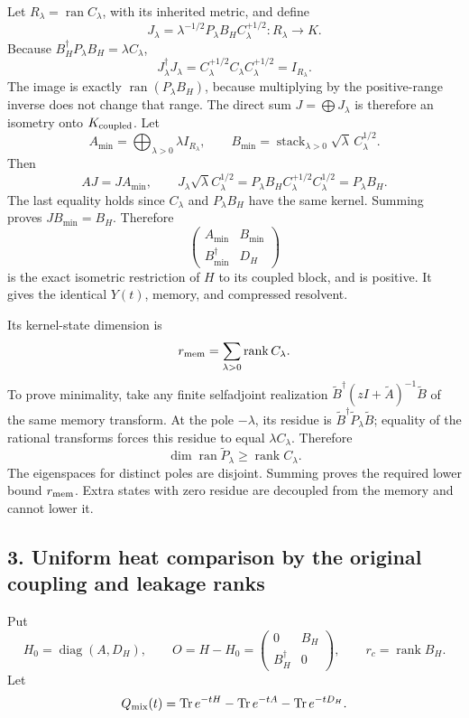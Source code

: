 \documentclass[11pt]{article}
\begin{document}
Let \(R_\lambda=\operatorname{ran}C_\lambda\), with its inherited metric, and define \[
 J_\lambda=\lambda^{-1/2}P_\lambda B_HC_\lambda^{+1/2}:R_\lambda\to K.
\] Because \(B_H^\dagger P_\lambda B_H=\lambda C_\lambda\), \[
 J_\lambda^\dagger J_\lambda
 =C_\lambda^{+1/2}C_\lambda C_\lambda^{+1/2}=I_{R_\lambda}.
\] The image is exactly \(\operatorname{ran}(P_\lambda B_H)\), because multiplying by the positive-range inverse does not change that range. The direct sum \(J=\bigoplus J_\lambda\) is therefore an isometry onto \(K_{\rm coupled}\). Let \[
 A_{\min}=\bigoplus_{\lambda>0}\lambda I_{R_\lambda},\qquad
 B_{\min}=\operatorname{stack}_{\lambda>0}\sqrt\lambda\,C_\lambda^{1/2}.
\] Then \[
 AJ=JA_{\min},\qquad
 J_\lambda\sqrt\lambda C_\lambda^{1/2}
 =P_\lambda B_H C_\lambda^{+1/2}C_\lambda^{1/2}
 =P_\lambda B_H.
\] The last equality holds since \(C_\lambda\) and \(P_\lambda B_H\) have the same kernel. Summing proves \(JB_{\min}=B_H\). Therefore \[
 \begin{pmatrix}A_{\min}&B_{\min}\\B_{\min}^\dagger&D_H\end{pmatrix}
\] is the exact isometric restriction of \(H\) to its coupled block, and is positive. It gives the identical \(Y(t)\), memory, and compressed resolvent.

Its kernel-state dimension is \[
 r_{\rm mem}=\sum_{\lambda>0}\operatorname{rank}C_\lambda.
\] To prove minimality, take any finite selfadjoint realization \(\widetilde B^\dagger(zI+\widetilde A)^{-1}\widetilde B\) of the same memory transform. At the pole \(-\lambda\), its residue is \(\widetilde B^\dagger\widetilde P_\lambda\widetilde B\); equality of the rational transforms forces this residue to equal \(\lambda C_\lambda\). Therefore \[
 \dim\operatorname{ran}\widetilde P_\lambda
 \ge\operatorname{rank}C_\lambda.
\] The eigenspaces for distinct poles are disjoint. Summing proves the required lower bound \(r_{\rm mem}\). Extra states with zero residue are decoupled from the memory and cannot lower it.

\subsection{3. Uniform heat comparison by the original coupling and leakage ranks}\label{uniform-heat-comparison-by-the-original-coupling-and-leakage-ranks}

Put \[
 H_0=\operatorname{diag}(A,D_H),\qquad
 O=H-H_0=
 \begin{pmatrix}0&B_H\\B_H^\dagger&0\end{pmatrix},\qquad
 r_c=\operatorname{rank}B_H.
\] Let \[
 Q_{\rm mix}(t)=\operatorname{Tr}e^{-tH}
       -\operatorname{Tr}e^{-tA}-\operatorname{Tr}e^{-tD_H}.
\]
\end{document}
